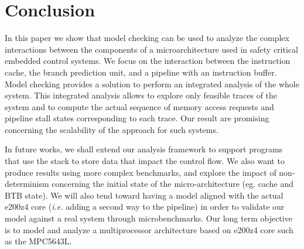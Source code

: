 \section{Conclusion}
\label{sec:conclusion}

In this paper we show that model checking can be used to analyze the complex interactions between the components of a microarchitecture used in safety critical embedded control systems.
We focus on the interaction between the instruction cache, the branch prediction unit, and a pipeline with an instruction buffer.
Model checking provides a solution to perform an integrated analysis of the whole system.
This integrated analysis allows to explore only feasible traces of the system and to compute the actual sequence of memory access requests and pipeline stall states corresponding to each trace.
Our result are promising concerning the scalability of the approach for such systems.

In future works, we shall extend our analysis framework to support programs
that use the stack to store data that impact the control flow. We also want to
produce results using more complex benchmarks, and explore the impact of non-determinism concerning the initial state of the micro-architecture (eg. cache and BTB state).
We will also tend toward having a model aligned with the actual e200z4 core (\textsl{i.e.} adding a second way to the pipeline) in order to validate our model against a real system through microbenchmarks.
Our long term objective is to model and analyze a multiprocessor architecture based on e200z4 core such as the MPC5643L.


